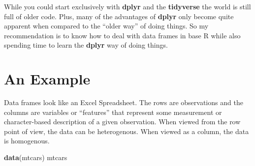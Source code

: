 \documentclass[]{book}
\newenvironment{Shaded}{\begin{snugshade}}{\end{snugshade}}
\newcommand{\KeywordTok}[1]{\textcolor[rgb]{0.13,0.29,0.53}{\textbf{#1}}}
\newcommand{\NormalTok}[1]{#1}
\begin{document}
While you could start exclusively with \textbf{dplyr} and the
\textbf{tidyverse} the world is still full of older code. Plus, many of
the advantages of \textbf{dplyr} only become quite apparent when
compared to the ``older way'' of doing things. So my recommendation is
to know how to deal with data frames in base R while also spending time
to learn the \textbf{dplyr} way of doing things.

\chapter{An Example}\label{an-example}

Data frames look like an Excel Spreadsheet. The rows are observations
and the columns are variables or ``features'' that represent some
measurement or character-based description of a given observation. When
viewed from the row point of view, the data can be heterogenous. When
viewed as a column, the data is homogenous.

\begin{Shaded}
\begin{Highlighting}[]
\KeywordTok{data}\NormalTok{(mtcars)}
\NormalTok{mtcars}
\end{Highlighting}
\end{Shaded}
\end{document}

